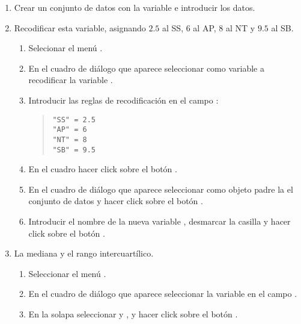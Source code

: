 \begin{enumerate}[leftmargin=*]
\begin{enumerate}
\item  Crear un conjunto de datos  con la variable  e introducir los datos.

\item  Recodificar esta variable, asignando $2.5$ al SS, $6$ al AP, $8$ al NT y $9.5$ al SB.
\begin{indicacion}
\begin{enumerate}
\item Selecionar el menú .
\item En el cuadro de diálogo que aparece seleccionar como variable a recodificar la variable .
\item Introducir las reglas de recodificación en el campo :
\begin{quote}
\lstinline{"SS" = 2.5}\\
\lstinline{"AP" = 6}\\
\lstinline{"NT" = 8}\\
\lstinline{"SB" = 9.5}
\end{quote}
\item En el cuadro  hacer click sobre el botón .
\item En el cuadro de diálogo que aparece seleccionar como objeto padre la el conjunto de datos  y hacer click sobre el botón .
\item Introducir el nombre de la nueva variable , desmarcar la casilla  y hacer click sobre el botón .
\end{enumerate}
\end{indicacion}

\item La mediana y el rango intercuartílico.
\begin{indicacion}
\begin{enumerate}
\item Seleccionar el menú .
\item En el cuadro de diálogo que aparece seleccionar la variable  en el campo .
\item En la solapa  seleccionar  y , 
y hacer click sobre el botón .
\end{enumerate}
\end{indicacion}
\end{enumerate}


\end{enumerate}
